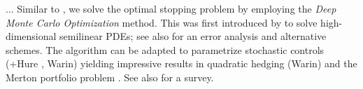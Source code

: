 ... 
Similar to \cite{Becker1,Becker2}, we solve the optimal stopping problem by employing the \textit{Deep Monte Carlo Optimization} method. This was  first introduced by \citet{HanJentzenE} to solve high-dimensional semilinear PDEs; see also \cite{Germain} for an error analysis and alternative schemes. The algorithm can be adapted to parametrize  stochastic controls \cite{HanE} (+Hure , Warin) yielding impressive results  in quadratic hedging  (Warin) and the  Merton portfolio problem  \cite{ReppenSoner}. See also \cite{ReppenSonerTissot} for a survey.     %
 
